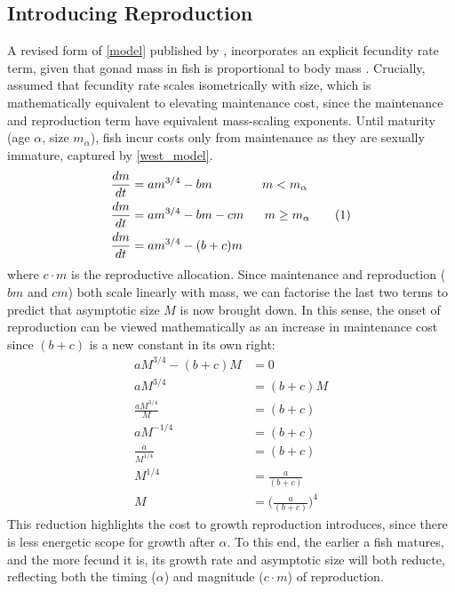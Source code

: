 \documentclass[a4paper]{article} %
\newcommand\numberthis{\addtocounter{equation}{1}\tag{\theequation}}
\begin{document}
\subsection{Introducing Reproduction}
A revised form of \cref{model} published by \textcite{Charnov2001}, incorporates an explicit fecundity rate term, given that gonad mass in fish is proportional to body mass \autocite{Charnov2001, Roff1983, peters1983, kozlowski1996}. Crucially, \textcite{Charnov2001} assumed that fecundity rate scales isometrically with size, which is mathematically equivalent to elevating maintenance cost, since the maintenance and reproduction term have equivalent mass-scaling exponents. Until maturity (age $\alpha$, size $m_{\alpha}$), fish incur costs only from maintenance as they are sexually immature, captured by \cref{west_model}. 
\begin{align*}
    \frac{dm}{dt} &= am^{3/4} - bm \ \ \ \ \ \ \ \ \ \ \ \ m < m_{\alpha} \\
    \frac{dm}{dt} &= am^{3/4} - bm - cm \ \ \ \ \ m \geq m_{\alpha} \numberthis \label{charnov2001} \\
    \frac{dm}{dt} &= am^{3/4} - (b+c)m
\end{align*}
where $c \cdot m$ is the reproductive allocation. Since maintenance and reproduction ($bm$ and $cm$) both scale linearly with mass, we can factorise the last two terms to predict that asymptotic size $M$ is now brought down. In this sense, the onset of reproduction can be viewed mathematically as an increase in maintenance cost since $(b+c)$ is a new constant in its own right:
\begin{align*}
    aM^{3/4} - (b+c)M &= 0 \\
    aM^{3/4} &= (b+c)M \\
    \frac{aM^{3/4}}{M} &= (b+c) \\
    aM^{-1/4} &= (b+c) \\
    \frac{a}{M^{1/4}} &= (b+c) \\
    M^{1/4} &= \frac{a}{(b+c)} \\
    M &= \Bigg(\frac{a}{(b+c)}\Bigg)^4
\end{align*}
This reduction highlights the cost to growth reproduction introduces, since there is less energetic scope for growth after $\alpha$. To this end, the earlier a fish matures, and the more fecund it is, its growth rate and asymptotic size will both reducte, reflecting both the timing ($\alpha$) and magnitude ($c\cdot{m}$) of reproduction.
\end{document}
